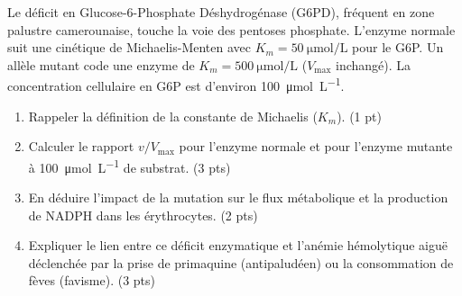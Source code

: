 \documentclass[11pt]{article}
\begin{document}
\begin{exercice}
Le déficit en Glucose-6-Phosphate Déshydrogénase (G6PD), fréquent en zone palustre camerounaise, touche la voie des pentoses phosphate. L'enzyme normale suit une cinétique de Michaelis-Menten avec $K_m = \SI{50}{\micro\mole\per\liter}$ pour le G6P. Un allèle mutant code une enzyme de $K_m = \SI{500}{\micro\mole\per\liter}$ ($V_{\max}$ inchangé). La concentration cellulaire en G6P est d'environ \SI{100}{\micro\mole\per\liter}.
\begin{enumerate}
    \item Rappeler la définition de la constante de Michaelis ($K_m$). (1 pt)
    \item Calculer le rapport $v/V_{\max}$ pour l'enzyme normale et pour l'enzyme mutante à \SI{100}{\micro\mole\per\liter} de substrat. (3 pts)
    \item En déduire l'impact de la mutation sur le flux métabolique et la production de NADPH dans les érythrocytes. (2 pts)
    \item Expliquer le lien entre ce déficit enzymatique et l'anémie hémolytique aiguë déclenchée par la prise de primaquine (antipaludéen) ou la consommation de fèves (favisme). (3 pts)
\end{enumerate}
\end{exercice}
\end{document}
